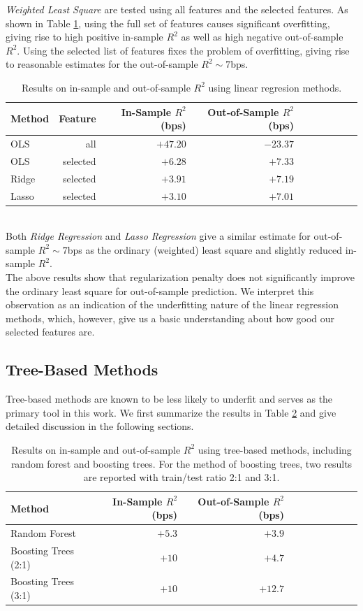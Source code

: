 \documentclass[
11pt, %
a4paper, %
oneside, %
headinclude,footinclude, %
BCOR5mm, %
]{scrartcl}
\begin{document}
\textit{Weighted Least Square} are tested using all features and the selected features. As shown in Table \ref{linearregression}, using the full set of 
features causes significant overfitting, giving rise to high positive in-sample $R^2$ as well as high negative out-of-sample $R^2$. Using the selected list
of features fixes the problem of overfitting, giving rise to reasonable estimates for the out-of-sample $R^2\sim 7$bps.\\
\begin{table}[ht!]
\center
	\begin{tabular}{lrrrrrrrrr}  
		\toprule
		Method & Feature & In-Sample $R^2$(bps) & Out-of-Sample $R^2$(bps) \\
		\midrule
	    OLS & all  & $+47.20$	& $-23.37$	 \\
		OLS & selected  & $+6.28$	& $+7.33$	 \\
		Ridge & selected  & 	$+3.91$ & $+7.19$	  \\
		Lasso & selected  & $+3.10$	& $+7.01$	 \\
		\bottomrule
	\end{tabular}
	\caption{Results on in-sample and out-of-sample $R^2$ using linear regresion methods.}\label{linearregression}
\end{table}\\
Both \textit{Ridge Regression} and \textit{Lasso Regression} give a similar estimate for out-of-sample $R^2\sim 7$bps as the ordinary (weighted) least square and slightly reduced in-sample $R^2$.\\
\newline
The above results show that regularization penalty does not significantly improve the ordinary least square for out-of-sample prediction. We interpret this observation as an indication of the underfitting nature of the linear regression methods, which, however, give us a basic understanding about how good our selected features are.

\subsection{Tree-Based Methods}
Tree-based methods are known to be less likely to underfit and serves as the primary tool in this work. We first summarize the results in Table \ref{treemethods} and give detailed discussion in the following sections.

\begin{table}[ht!]
\center
	\begin{tabular}{lrrrrrrrrr}  
		\toprule
		Method & In-Sample $R^2$(bps) & Out-of-Sample $R^2$(bps) \\
		\midrule
	    Random Forest  & $+5.3$	& $+3.9$	 \\
		Boosting Trees (2:1) & $+10$	& $+4.7$	 \\
		Boosting Trees (3:1)  & $+10$	& $+12.7$	 \\
		\bottomrule
	\end{tabular}
	\caption{Results on in-sample and out-of-sample $R^2$ using tree-based methods, including random forest and boosting trees. For the method of boosting trees, two results are reported with train/test ratio 2:1 and 3:1.}\label{treemethods}
\end{table}
\end{document}
